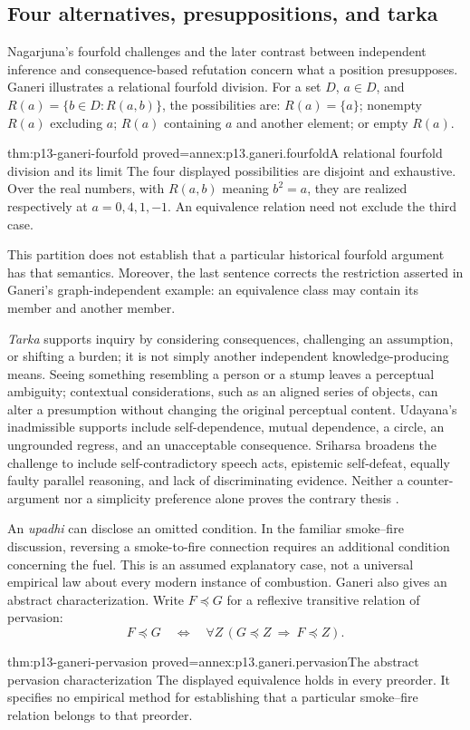\subsection{Four alternatives, presuppositions, and tarka}

Nagarjuna's fourfold challenges and the later contrast between independent
inference and consequence-based refutation concern what a position
presupposes. Ganeri illustrates a relational fourfold division. For a set
\(D\), \(a\in D\), and \(R(a)=\{b\in D:R(a,b)\}\), the possibilities are:
\(R(a)=\{a\}\); nonempty \(R(a)\) excluding \(a\); \(R(a)\) containing \(a\)
and another element; or empty \(R(a)\).

\begin{hblemma}{thm:p13-ganeri-fourfold}
 {proved=annex:p13.ganeri.fourfold}{A relational fourfold division and its limit}
The four displayed possibilities are disjoint and exhaustive. Over the real
numbers, with \(R(a,b)\) meaning \(b^2=a\), they are realized respectively
at \(a=0,4,1,-1\). An equivalence relation need not exclude the third case.
\end{hblemma}

This partition does not establish that a particular historical fourfold
argument has that semantics. Moreover, the last sentence corrects the
restriction asserted in Ganeri's graph-independent example:
an equivalence class may contain its member and another member.

\emph{Tarka} supports inquiry by considering consequences, challenging an
assumption, or shifting a burden; it is not simply another independent
knowledge-producing means. Seeing something resembling a person or a stump
leaves a perceptual ambiguity; contextual considerations, such as an aligned
series of objects, can alter a presumption without changing the original
perceptual content. Udayana's inadmissible supports include self-dependence,
mutual dependence, a circle, an ungrounded regress, and an unacceptable
consequence. Sriharsa broadens the challenge to include self-contradictory
speech acts, epistemic self-defeat, equally faulty parallel reasoning, and
lack of discriminating evidence. Neither a counter-argument nor a simplicity
preference alone proves the contrary thesis
\cite[pp.~334--340]{Ganeri2004IndianLogicPublished}.

An \emph{upadhi} can disclose an omitted condition. In the familiar
smoke--fire discussion, reversing a smoke-to-fire connection requires an
additional condition concerning the fuel. This is an assumed explanatory
case, not a universal empirical law about every modern instance of combustion.
Ganeri also gives an abstract characterization. Write \(F\preceq G\) for a
reflexive transitive relation of pervasion:
\[
 F\preceq G\quad\Longleftrightarrow\quad
 \forall Z\,(G\preceq Z\ \Longrightarrow\ F\preceq Z).
\]
\begin{hblemma}{thm:p13-ganeri-pervasion}
 {proved=annex:p13.ganeri.pervasion}{The abstract pervasion characterization}
The displayed equivalence holds in every preorder. It specifies no empirical
method for establishing that a particular smoke--fire relation belongs
to that preorder.
\end{hblemma}

